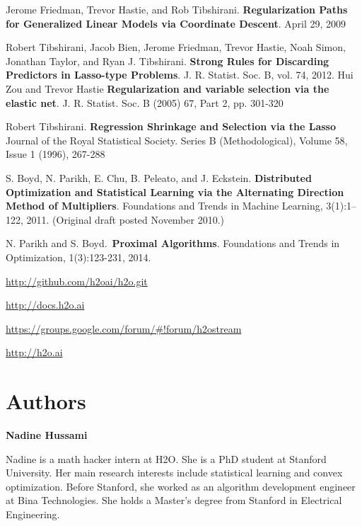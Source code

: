 

\newpage

\begin{thebibliography}{9}

Jerome Friedman, Trevor Hastie, and Rob Tibshirani.
\textbf{Regularization Paths for Generalized Linear Models via Coordinate Descent}.
April 29, 2009

  Robert Tibshirani, Jacob Bien, Jerome Friedman, Trevor Hastie, Noah Simon, Jonathan Taylor, and Ryan J. Tibshirani. 
  \textbf{Strong Rules for Discarding Predictors in Lasso-type Problems}.
  J. R. Statist. Soc. B, vol. 74, 2012.
Hui Zou and Trevor Hastie
\textbf{Regularization and variable selection via the elastic net}. 
J. R. Statist. Soc. B (2005) 67, Part 2, pp. 301-320

Robert Tibshirani.
\textbf{Regression Shrinkage and Selection via the Lasso}
Journal of the Royal Statistical Society. Series B (Methodological), Volume 58, Issue 1 (1996), 267-288

S. Boyd, N. Parikh, E. Chu, B. Peleato, and J. Eckstein.
\textbf{Distributed Optimization and Statistical Learning via the Alternating Direction Method of Multipliers}. 
Foundations and Trends in Machine Learning, 3(1):1–122, 2011. (Original draft posted November 2010.)

N. Parikh and S. Boyd.\
\textbf{Proximal Algorithms}.
Foundations and Trends in Optimization, 1(3):123-231, 2014.

{\url{http://github.com/h2oai/h2o.git}}

{\url{http://docs.h2o.ai}}

{\url{https://groups.google.com/forum/#!forum/h2ostream}}

{\url{http://h2o.ai}}


\end{thebibliography}

\newpage

\section{Authors}

\textbf{Nadine Hussami}

Nadine is a math hacker intern at H2O. She is a PhD student at Stanford University. Her main research interests include statistical learning and convex optimization. Before Stanford, she worked as an algorithm development engineer at Bina Technologies. She holds a Master’s degree from Stanford in Electrical Engineering. 

